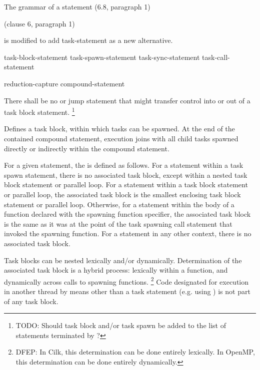 
\pnum
The grammar of a statement (6.8, paragraph 1)
\begin{cpp}
(clause 6, paragraph 1)
\end{cpp}
is modified to add task-statement as a new alternative.


\begin{bnf}
\br
task-block-statement
\br
task-spawn-statement
\br
task-sync-statement
\br
task-call-statement
\end{bnf}


\begin{bnf}
\br
{}  reduction-capture\opt{} compound-statement
\end{bnf}


\pnum
There shall be no
or jump statement that might transfer control into or out of
a task block statement.
\footnote{TODO:
Should task block and/or task spawn be added to the list of statements
terminated by
?
}


\pnum
Defines a task block, within which tasks can be spawned.
At the end of the contained compound statement,
execution joins with
all child tasks spawned directly or indirectly
within the compound statement.

\pnum
For a given statement, the
is defined as follows.
For a statement within a task spawn statement,
there is no associated task block,
except within a nested task block statement
or parallel loop.
For a statement within a task block statement
or parallel loop,
the associated task block is the smallest enclosing task block statement
or parallel loop.
Otherwise, for a statement within the body of a function
declared with the spawning function specifier,
the associated task block is the same as it was
at the point of the task spawning call statement
that invoked the spawning function.
For a statement in any other context,
there is no associated task block.

\begin{note}
Task blocks can be nested lexically and/or dynamically.
Determination of the associated task block is a hybrid process:
lexically within a function,
and dynamically across calls to spawning functions.%
\footnote{DFEP:
In Cilk, this determination can be done entirely lexically.
In OpenMP, this determination can be done entirely dynamically.
}
Code designated for execution in another thread
by means other than a task statement
(e.g. using
)
is not part of any task block.
\end{note}

